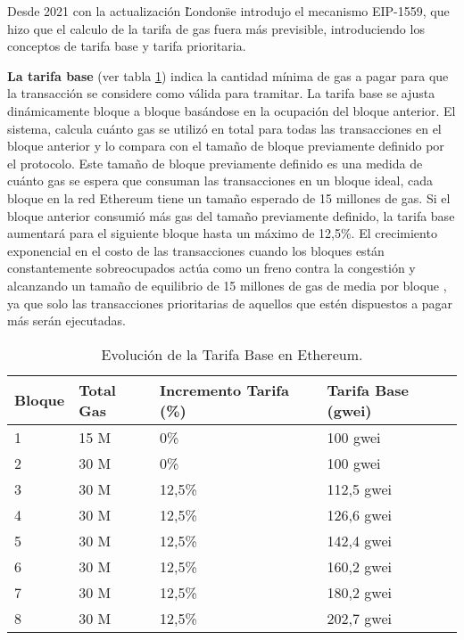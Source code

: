 Desde 2021 con la actualización \"London\" se introdujo el mecanismo EIP-1559, que hizo que el calculo de la tarifa de gas fuera más previsible, introduciendo los conceptos de tarifa 
base y tarifa prioritaria.

\textbf{La tarifa base} (ver tabla \ref{tabla:ajuste_tarifa_base}) indica la cantidad mínima de gas a pagar para que la transacción se considere como válida para tramitar.
La tarifa base se ajusta dinámicamente bloque a bloque basándose en la ocupación del bloque anterior. El sistema, calcula cuánto gas se utilizó en total para todas las transacciones en el bloque anterior y lo compara con el tamaño de bloque previamente definido por el protocolo. Este tamaño de bloque previamente definido es una medida de cuánto gas se espera que consuman las transacciones en un bloque ideal, cada bloque en la red Ethereum tiene un tamaño esperado de 15 millones de gas.
Si el bloque anterior consumió más gas del tamaño previamente definido, la tarifa base aumentará para el siguiente bloque hasta un máximo de 12,5\%. 
El crecimiento exponencial en el costo de las transacciones cuando los bloques están constantemente sobreocupados actúa como un freno contra la congestión y alcanzando un tamaño de equilibrio de 15 millones de gas de media por bloque , ya que solo las transacciones prioritarias de aquellos que estén dispuestos a pagar más serán ejecutadas.

\begin{table}
\normalsize
\begin{centering}
	\begin{tabular}{@{}p{4em} p{5em} p{6em} p{6em}@{}}
		\toprule
		\textbf{Bloque} & \textbf{Total Gas} & \textbf{Incremento Tarifa (\%)} & \textbf{Tarifa Base (gwei)}\\ 
		\midrule
		1 & 15 M & 0\% & 100 gwei \\
		2 & 30 M & 0\% & 100 gwei\\
		3 & 30 M & 12,5\% & 112,5 gwei\\
		4 & 30 M & 12,5\% & 126,6 gwei\\
		5 & 30 M & 12,5\% & 142,4 gwei\\
		6 & 30 M & 12,5\% & 160,2 gwei\\
		7 & 30 M & 12,5\% & 180,2 gwei\\
		8 & 30 M & 12,5\% & 202,7 gwei\\
		\bottomrule
	\end{tabular}
\caption[Ajuste de la Tarifa Base Bajo Demanda]{Evolución de la Tarifa Base en Ethereum.}
\label{tabla:ajuste_tarifa_base}
\end{centering}
\end{table}


